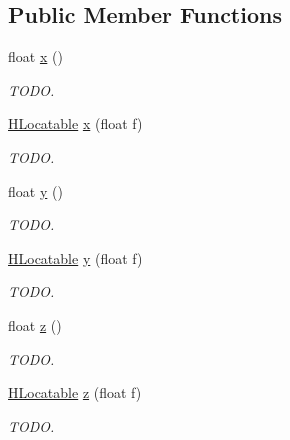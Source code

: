 \subsection*{Public Member Functions}
\begin{DoxyCompactItemize}
\item 
float \hyperlink{interfacehype_1_1core_1_1interfaces_1_1_h_locatable_a433e89000135fd8aceebeb6f7e39b8f3}{x} ()
\begin{DoxyCompactList}\small\item\em T\-O\-D\-O. \end{DoxyCompactList}\item 
\hyperlink{interfacehype_1_1core_1_1interfaces_1_1_h_locatable}{H\-Locatable} \hyperlink{interfacehype_1_1core_1_1interfaces_1_1_h_locatable_a00b6f188c796f87943bd0be622f88e76}{x} (float f)
\begin{DoxyCompactList}\small\item\em T\-O\-D\-O. \end{DoxyCompactList}\item 
float \hyperlink{interfacehype_1_1core_1_1interfaces_1_1_h_locatable_aa8148a4289eb112302a621cbc3b4a3e1}{y} ()
\begin{DoxyCompactList}\small\item\em T\-O\-D\-O. \end{DoxyCompactList}\item 
\hyperlink{interfacehype_1_1core_1_1interfaces_1_1_h_locatable}{H\-Locatable} \hyperlink{interfacehype_1_1core_1_1interfaces_1_1_h_locatable_aa5d5d397f037a290069c7f09153e15b5}{y} (float f)
\begin{DoxyCompactList}\small\item\em T\-O\-D\-O. \end{DoxyCompactList}\item 
float \hyperlink{interfacehype_1_1core_1_1interfaces_1_1_h_locatable_a39eb12015a40fe494f789607dec9c484}{z} ()
\begin{DoxyCompactList}\small\item\em T\-O\-D\-O. \end{DoxyCompactList}\item 
\hyperlink{interfacehype_1_1core_1_1interfaces_1_1_h_locatable}{H\-Locatable} \hyperlink{interfacehype_1_1core_1_1interfaces_1_1_h_locatable_a09c6622d7e8b39fb89f3bab9562ca6b4}{z} (float f)
\begin{DoxyCompactList}\small\item\em T\-O\-D\-O. \end{DoxyCompactList}\end{DoxyCompactItemize}


